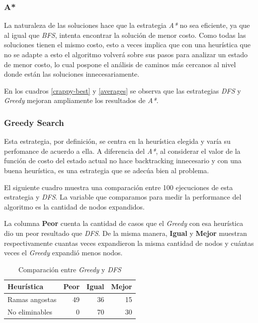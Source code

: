 \documentclass[a4paper,10pt]{article}
\begin{document}
    \subsubsection{A*}
    
    La naturaleza de las soluciones hace que la estrategia \textit{A*} no sea eficiente, ya que al igual que \textit{BFS}, intenta encontrar la solución de menor costo. Como todas las soluciones tienen el mismo costo, esto a veces implica que con una heurística que no se adapte a esto el algoritmo volverá sobre sus pasos para analizar un estado de menor costo, lo cual pospone el análisis de caminos más cercanos al nivel donde están las soluciones innecesariamente.

    En los cuadros \ref{crappy-best} y \ref{averages} se observa que las estrategias \textit{DFS} y \textit{Greedy} mejoran ampliamente los resultados de \textit{A*}.

    \subsubsection{Greedy Search}
    
    Esta estrategia, por definición, se centra en la heurística elegida y varía su perfomance de acuerdo a ella. A diferencia del \textit{A*}, al considerar el valor de la función de costo del estado actual no hace backtracking innecesario y con una buena heurística, es una estrategia que se adecúa bien al problema.

    El siguiente cuadro muestra una comparación entre 100 ejecuciones de esta estrategia y \textit{DFS}. La variable que comparamos para medir la performance del algoritmo es la cantidad de nodos expandidos.

    La columna \textbf{Peor} cuenta la cantidad de casos que el \textit{Greedy} con esa heurística dio un peor resultado que \textit{DFS}. De la misma manera, \textbf{Igual} y \textbf{Mejor} muestran respectivamente cuantas veces expandieron la misma cantidad de nodos y cuántas veces el \textit{Greedy} expandió menos nodos.

    \begin{table}[H]
        \label{greedy-dfs}

        \begin{center}
        \begin{tabular}{l|r|r|r}
            Heurística & Peor & Igual & Mejor \\
            \hline
            Ramas angostas & 49 & 36 & 15 \\
            No eliminables & 0 & 70 & 30 \\
        \end{tabular}
        \end{center}
        \caption{Comparación entre \textit{Greedy} y \textit{DFS}}

    \end{table}
\end{document}
